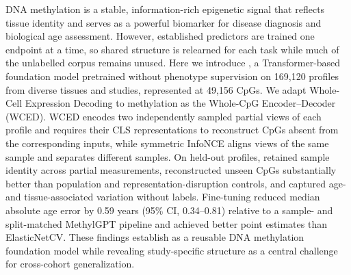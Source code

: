 DNA methylation is a stable, information-rich epigenetic signal that reflects tissue identity
and serves as a powerful biomarker for disease diagnosis and biological age assessment.
However, established predictors are trained one endpoint at a time, so shared structure is
relearned for each task while much of the unlabelled corpus remains unused. Here we introduce
\method{}, a Transformer-based foundation model pretrained without
phenotype supervision on 169{,}120 profiles from diverse tissues and studies, represented at
49{,}156 CpGs. We adapt Whole-Cell Expression Decoding to methylation as the Whole-CpG
Encoder--Decoder (WCED). WCED encodes
two independently sampled partial views of each profile and requires their CLS representations
to reconstruct CpGs absent from the corresponding inputs, while symmetric InfoNCE aligns views
of the same sample and separates different samples. On held-out profiles, \method{} retained
sample identity across partial measurements, reconstructed unseen CpGs substantially better than
population and representation-disruption controls, and captured age- and tissue-associated
variation without labels. Fine-tuning reduced median absolute age error by 0.59 years (95\% CI,
0.34--0.81) relative to a sample- and split-matched MethylGPT pipeline and achieved better
point estimates than ElasticNetCV. These findings establish \method{} as a reusable DNA methylation
foundation model while revealing study-specific structure as a central challenge for cross-cohort
generalization.

